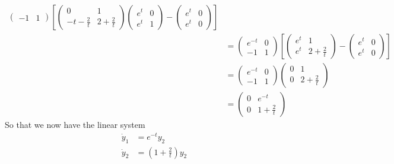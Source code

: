 \documentclass{article}
\begin{document}
\begin{itemize}
\begin{itemize}
\begin{align*}
\begin{pmatrix}
                -1 & 1
            \end{pmatrix}\left[\begin{pmatrix}
                0 & 1\\
                -t - \tfrac{2}{t} & 2 + \tfrac{2}{t}
            \end{pmatrix}\begin{pmatrix}
                e^t & 0\\
                e^t & 1
            \end{pmatrix} - \begin{pmatrix}
                e^t & 0\\
                e^t & 0
            \end{pmatrix}\right]\\
            &= \begin{pmatrix}
                e^{-t} & 0\\
                -1 & 1
            \end{pmatrix}\left[\begin{pmatrix}
                e^t & 1\\
                e^t & 2 + \tfrac{2}{t}
            \end{pmatrix} - \begin{pmatrix}
                e^t & 0\\
                e^t & 0
            \end{pmatrix}\right]\\
            &= \begin{pmatrix}
                e^{-t} & 0\\
                -1 & 1
            \end{pmatrix}\begin{pmatrix}
                0 & 1\\
                0 & 2 + \tfrac{2}{t}
            \end{pmatrix}\\
            &= \begin{pmatrix}
                0 & e^{-t}\\
                0 & 1 + \tfrac{2}{t}
            \end{pmatrix}
        \end{align*}
        So that we now have the linear system
        \begin{align*}
            \dot{y}_1 &= e^{-t}y_2\\
            \dot{y}_2 &= (1 + \tfrac{2}{t})y_2
        \end{align*}

\end{itemize}
\end{itemize}
\end{document}
